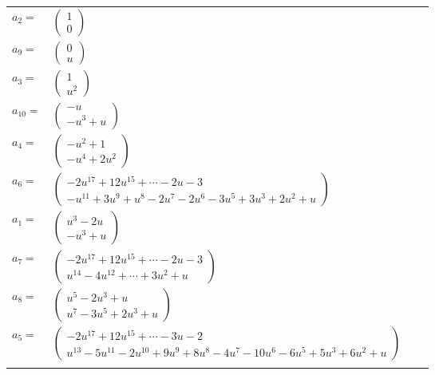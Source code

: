 \documentclass[1p]{elsarticle_modified}
\theoremstyle{definition}
\begin{document}
\begin{tabular}{m{7pt} m{180pt} m{7pt} m{180pt} }
\flushright $a_{2}=$&$\begin{pmatrix}1\\0\end{pmatrix}$ \\
\flushright $a_{9}=$&$\begin{pmatrix}0\\u\end{pmatrix}$ \\
\flushright $a_{3}=$&$\begin{pmatrix}1\\u^2\end{pmatrix}$ \\
\flushright $a_{10}=$&$\begin{pmatrix}- u\\- u^3+u\end{pmatrix}$ \\
\flushright $a_{4}=$&$\begin{pmatrix}- u^2+1\\- u^4+2 u^2\end{pmatrix}$ \\
\flushright $a_{6}=$&$\begin{pmatrix}-2 u^{17}+12 u^{15}+\cdots-2 u-3\\- u^{11}+3 u^9+u^8-2 u^7-2 u^6-3 u^5+3 u^3+2 u^2+u\end{pmatrix}$ \\
\flushright $a_{1}=$&$\begin{pmatrix}u^3-2 u\\- u^3+u\end{pmatrix}$ \\
\flushright $a_{7}=$&$\begin{pmatrix}-2 u^{17}+12 u^{15}+\cdots-2 u-3\\u^{14}-4 u^{12}+\cdots+3 u^2+u\end{pmatrix}$ \\
\flushright $a_{8}=$&$\begin{pmatrix}u^5-2 u^3+u\\u^7-3 u^5+2 u^3+u\end{pmatrix}$ \\
\flushright $a_{5}=$&$\begin{pmatrix}-2 u^{17}+12 u^{15}+\cdots-3 u-2\\u^{13}-5 u^{11}-2 u^{10}+9 u^9+8 u^8-4 u^7-10 u^6-6 u^5+5 u^3+6 u^2+u\end{pmatrix}$\\&\end{tabular}
\end{document}
